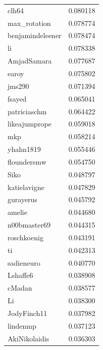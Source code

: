 \documentclass[9pt,lineno]{elife}
\begin{document}
\begin{appendixbox}
\begin{longtable}{lr}
clh64                      &                  0.080118 \\
max\_rotation               &                  0.078774 \\
benjamindeleener           &                  0.078474 \\
li                         &                  0.078338 \\
AmjadSamara                &                  0.077687 \\
earoy                      &                  0.075802 \\
jms290                     &                  0.071394 \\
fsayed                     &                  0.065041 \\
patriciaschm               &                  0.064422 \\
likeajumprope              &                  0.059018 \\
mkp                        &                  0.058214 \\
yhahn1819                  &                  0.055446 \\
floundersmw                &                  0.054750 \\
Siko                       &                  0.048797 \\
katielavigne               &                  0.047829 \\
gurayerus                  &                  0.045792 \\
amelie                     &                  0.044680 \\
n00bmaster69               &                  0.044315 \\
roschkoenig                &                  0.043191 \\
ti                         &                  0.042313 \\
sadieneuro                 &                  0.040770 \\
Lshaffe6                   &                  0.038908 \\
cMadan                     &                  0.038577 \\
Li                         &                  0.038300 \\
JodyFinch11                &                  0.037982 \\
lindenmp                   &                  0.037123 \\
AkiNikolaidis              &                  0.036303 \\

\end{longtable}
\end{appendixbox}
\end{document}
